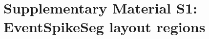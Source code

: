 \documentclass[10pt,a4paper]{article}
\begin{document}
\section*{Supplementary Material S1: EventSpikeSeg layout regions}
\setcounter{figure}{0}
\renewcommand{\thefigure}{S\arabic{figure}}
\renewcommand{\theHfigure}{S\arabic{figure}}

\end{document}
